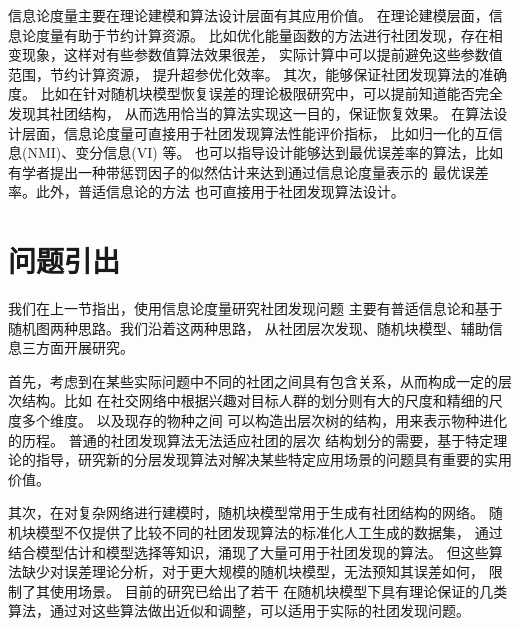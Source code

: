 信息论度量主要在理论建模和算法设计层面有其应用价值。
在理论建模层面，信息论度量有助于节约计算资源。
比如优化能量函数的方法进行社团发现，存在相变现象，这样对有些参数值算法效果很差，
实际计算中可以提前避免这些参数值范围，节约计算资源，
提升超参优化效率\cite{ye2020exact}。
其次，能够保证社团发现算法的准确度。
比如在针对随机块模型恢复误差的理论极限研究中，可以提前知道能否完全发现其社团结构，
从而选用恰当的算法实现这一目的，保证恢复效果\cite{abbe2015community}。
在算法设计层面，信息论度量可直接用于社团发现算法性能评价指标，
比如归一化的互信息(NMI)\cite{Danon_2005}、变分信息(VI) \cite{2007Comparing}等。
也可以指导设计能够达到最优误差率的算法，比如
有学者提出一种带惩罚因子的似然估计来达到通过信息论度量表示的
最优误差率\cite{zhang2016}。此外，普适信息论的方法
也可直接用于社团发现算法设计\cite{ic2002, mim, app12094203}。


\section{问题引出}
我们在上一节指出，使用信息论度量研究社团发现问题
主要有普适信息论和基于随机图两种思路。我们沿着这两种思路，
从社团层次发现、随机块模型、辅助信息三方面开展研究。




首先，考虑到在某些实际问题中不同的社团之间具有包含关系，从而构成一定的层次结构。比如
在社交网络中根据兴趣对目标人群的划分则有大的尺度和精细的尺度多个维度。
以及现存的物种之间
可以构造出层次树的结构，用来表示物种进化的历程。
普通的社团发现算法无法适应社团的层次
结构划分的需要，基于特定理论的指导，研究新的分层发现算法对解决某些特定应用场景的问题具有重要的实用价值。

其次，在对复杂网络进行建模时，随机块模型常用于生成有社团结构的网络。
随机块模型不仅提供了比较不同的社团发现算法的标准化人工生成的数据集，
通过结合模型估计和模型选择等知识，涌现了大量可用于社团发现的算法。
但这些算法缺少对误差理论分析，对于更大规模的随机块模型，无法预知其误差如何，
限制了其使用场景。
目前的研究已给出了若干
在随机块模型下具有理论保证的几类算法，通过对这些算法做出近似和调整，可以适用于实际的社团发现问题。


